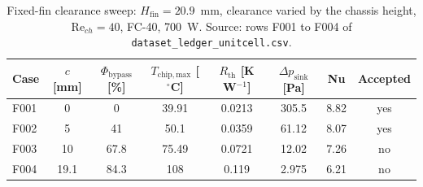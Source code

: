 \begin{table}[htbp]
\centering
\caption{Fixed-fin clearance sweep: $H_{\mathrm{fin}} = 20.9$~mm, clearance varied by the chassis height, $\mathrm{Re}_{ch} = 40$, FC-40, 700~W. Source: rows F001 to F004 of \texttt{dataset\_ledger\_unitcell.csv}.}
\label{tab:fixed_fin}
\scriptsize
\begin{tabular}{@{}lccccccc@{}}
\hline
Case & $c$ [mm] & $\Phi_{\mathrm{bypass}}$ [\%] & $T_{\mathrm{chip,max}}$ [$^{\circ}$C] & $R_{\mathrm{th}}$ [K W$^{-1}$] & $\Delta p_{\mathrm{sink}}$ [Pa] & Nu & Accepted \\
\hline
F001 & 0 & 0 & 39.91 & 0.0213 & 305.5 & 8.82 & yes \\
F002 & 5 & 41 & 50.1 & 0.0359 & 61.12 & 8.07 & yes \\
F003 & 10 & 67.8 & 75.49 & 0.0721 & 12.02 & 7.26 & no \\
F004 & 19.1 & 84.3 & 108 & 0.119 & 2.975 & 6.21 & no \\
\hline
\end{tabular}
\end{table}

